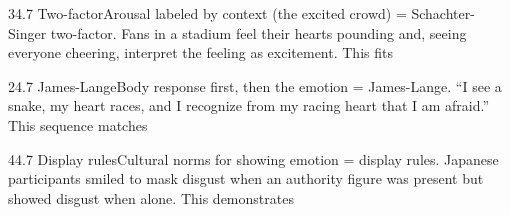\documentclass[11pt]{article}
\begin{document}
\begin{q}{3}{4.7 Two-factor}{Arousal labeled by context (the excited crowd) = Schachter-Singer two-factor.}
Fans in a stadium feel their hearts pounding and, seeing everyone cheering, interpret the feeling as excitement. This fits
\end{q}

\begin{q}{2}{4.7 James-Lange}{Body response first, then the emotion = James-Lange.}
``I see a snake, my heart races, and I recognize from my racing heart that I am afraid.'' This sequence matches
\end{q}

\begin{q}{4}{4.7 Display rules}{Cultural norms for showing emotion = display rules.}
Japanese participants smiled to mask disgust when an authority figure was present but showed disgust when alone. This demonstrates
\end{q}

\makekey
\end{document}
